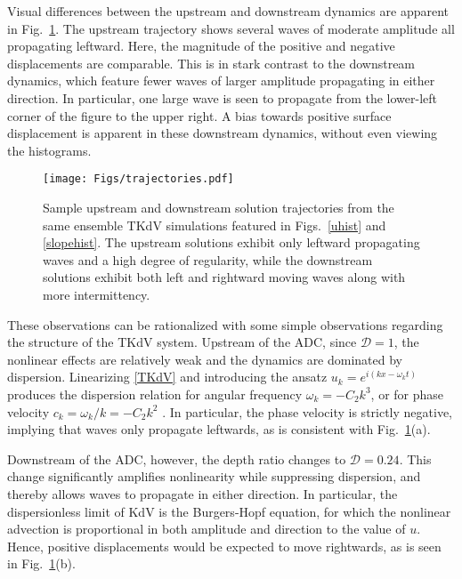 \documentclass[11pt]{article}
\newcommand{\new}[1]{{ #1}}
\newcommand{\drat}{\mathcal{D}}
\begin{document}
	Visual differences between the upstream and downstream dynamics are apparent in Fig.~\ref{trajectories}. The upstream trajectory shows several waves of \new{moderate} amplitude all propagating leftward. Here, the magnitude of the positive and negative displacements are comparable. This is in stark contrast to the downstream dynamics, which feature fewer waves of larger amplitude propagating in either direction. In particular, one large wave is seen to propagate from the lower-left corner of the figure to the upper right. A bias towards positive surface displacement is apparent in these downstream dynamics, without even viewing the histograms.

\begin{figure}%
\begin{center}
\texttt{[image: Figs/trajectories.pdf]}
\caption{
Sample upstream and downstream solution trajectories from the same ensemble TKdV simulations featured in Figs.~\ref{uhist} and \ref{slopehist}. The upstream solutions exhibit only leftward propagating waves and a high degree of regularity, while the downstream solutions exhibit both left and rightward moving waves along with more intermittency.
}
\label{trajectories}
\end{center}
\end{figure}

These observations can be rationalized with some simple observations regarding the structure of the TKdV system. Upstream of the ADC, since $\drat = 1$, the nonlinear effects are relatively weak and the dynamics are dominated by dispersion. Linearizing \eqref{TKdV} and introducing the ansatz $u_k = e^{i(kx - \omega_k t)}$ produces the dispersion relation for angular frequency $\omega_k = -C_2 k^3$, or for phase velocity $c_k = \omega_k/k = -C_2 k^2$ \cite{majdaqi2019}. In particular, the phase velocity is strictly negative, implying that waves only propagate leftwards, as is consistent with Fig.~\ref{trajectories}(a).

	Downstream of the ADC, however, the depth ratio changes to $\drat = 0.24$. This change significantly amplifies nonlinearity while suppressing dispersion, and thereby allows waves to propagate in either direction. In particular, the dispersionless limit of KdV is the Burgers-Hopf equation, for which the nonlinear advection is proportional in both amplitude and direction to the value of $u$. Hence, positive displacements would be expected to move rightwards, as is seen in Fig.~\ref{trajectories}(b).
\end{document}
